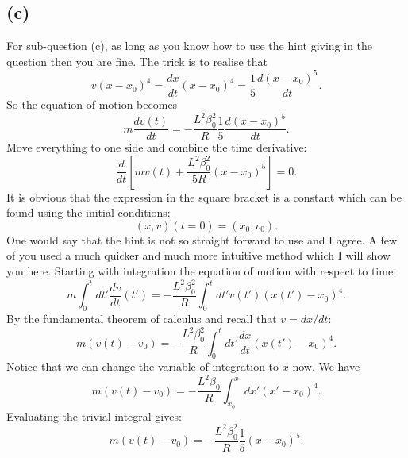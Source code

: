 \documentclass[a4paper]{article}
\begin{document}
\subsection*{(c)}
For sub-question (c), as long as you know how to use the hint giving in the question then you are fine. The trick is to realise that 
\[
    v (x-x_0)^4 = \frac{dx}{dt} (x-x_0)^4 = \frac{1}{5} \frac{d(x-x_0)^5}{dt}
.\] 
So the equation of motion becomes
\[
    m \frac{dv(t)}{dt} = -\frac{L^2 \beta_0^2 }{R} \frac{1}{5} \frac{d(x-x_0)^5}{dt}
.\] 
Move everything to one side and combine the time derivative:
\[
    \frac{d}{dt} \left[ m v(t) + \frac{L^2 \beta_0^2}{5R} (x-x_0)^5\right] = 0
.\] 
It is obvious that the expression in the square bracket is a constant which can be found using the initial conditions:
\[
    (x, v)(t=0) = (x_0, v_0)
.\] 
One would say that the hint is not so straight forward to use and I agree. 
A few of you used a much quicker and much more intuitive method which I will show you here.
Starting with integration the equation of motion with respect to time:
\[
    m \int_0^t dt' \frac{d v}{dt}(t') = -\frac{L^2 \beta_0^2}{R} \int_0^t dt' v(t') (x(t')-x_0)^4
.\] 
By the fundamental theorem of calculus and recall that $v = dx/dt$:
\[
    m (v(t)-v_0) = -\frac{L^2 \beta_0^2}{R} \int_0^t dt' \frac{dx}{dt} (x(t')-x_0)^4
.\] 
Notice that we can change the variable of integration to $x$ now. We have 
 \[
     m(v(t)-v_0) = - \frac{L^2 \beta_0}{R} \int_{x_0}^x dx' (x'-x_0)^4
.\] 
Evaluating the trivial integral gives:
\[
m(v(t)-v_0) = - \frac{L^2 \beta_0^2}{R} \frac{1}{5} (x-x_0)^5
.\] 
\end{document}
